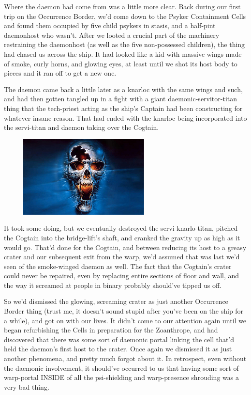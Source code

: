 Where the daemon had come from was a little more clear. 
Back during our first trip on the Occurrence Border, we'd come down to the Psyker Containment Cells and found them occupied by five child psykers in stasis, and a half-pint daemonhost who wasn't. 
After we looted a crucial part of the machinery restraining the daemonhost (as well as the five non-possessed children), the thing had chased us across the ship. 
It had looked like a kid with massive wings made of smoke, curly horns, and glowing eyes, at least until we shot its host body to pieces and it ran off to get a new one. 


The daemon came back a little later as a knarloc with the same wings and such, and had then gotten tangled up in a fight with a giant daemonic-servitor-titan thing that the tech-priest acting as the ship's Captain had been constructing for whatever insane reason. 
That had ended with the knarloc being incorporated into the servi-titan and daemon taking over the Cogtain.

\begin{figure}
	\begin{center}
		\includegraphics[width=\figwidth]{pics/15/40.png}
	\end{center}
\end{figure}
It took some doing, but we eventually destroyed the servi-knarlo-titan, pitched the Cogtain into the bridge-lift's shaft, and cranked the gravity up as high as it would go. 
That'd done for the Cogtain, and between reducing its host to a greasy crater and our subsequent exit from the warp, we'd assumed that was last we'd seen of the smoke-winged daemon as well. 
The fact that the Cogtain's crater could never be repaired, even  by replacing entire sections of floor and wall, and the way it screamed at people in binary probably should've tipped us off.

So we'd dismissed the glowing, screaming crater as just another Occurrence Border thing (trust me, it doesn't sound stupid after you've been on the ship for a while), and got on with our lives. 
It didn't come to our attention again until we began refurbishing the Cells in preparation for the Zoanthrope, and had discovered that there was some sort of daemonic portal linking the cell that'd held the daemon's first host to the crater. 
Once again we dismissed it as just another phenomena, and pretty much forgot about it. 
In retrospect, even without the daemonic involvement, it should've occurred to us that having some sort of warp-portal INSIDE of all the psi-shielding and warp-presence shrouding was a very bad thing.

